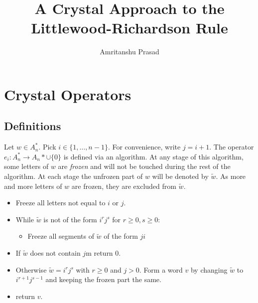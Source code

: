 \documentclass[12pt]{amsart}
\title{A Crystal Approach to the Littlewood-Richardson Rule}
\author{Amritanshu Prasad}
\theoremstyle{definition}
\theoremstyle{example}
\begin{document}
\section{Crystal Operators}
\subsection{Definitions}
Let $w\in A_n^*$.
Pick $i\in \{1,\dotsc,n-1\}$.
For convenience, write $j=i+1$.
The operator $e_i:A_n^*\to A_n*\cup\{0\}$ is defined via an algorithm.
At any stage of this algorithm, some letters of $w$ are \emph{frozen} and will not be touched during the rest of the algorithm.
At each stage the unfrozen part of $w$ will be denoted by $\tilde w$.
As more and more letters of $w$ are frozen, they are excluded from $\tilde w$.
\begin{itemize}
\item Freeze all letters not equal to $i$ or $j$.
\item While $\tilde w$ is not of the form $i^rj^s$ for $r\geq 0, s\geq 0$:
  \begin{itemize}
  \item Freeze all segments of $\tilde w$ of the form $ji$
  \end{itemize}
\item If $\tilde w$ does not contain $j$m return $0$.
\item Otherwise $\tilde w=i^rj^s$ with $r\geq 0$ and $j>0$.
  Form a word $v$ by changing $\tilde w$ to $i^{r+1}j^{s-1}$ and keeping the frozen part the same.
\item return $v$.
\end{itemize}
\end{document}
